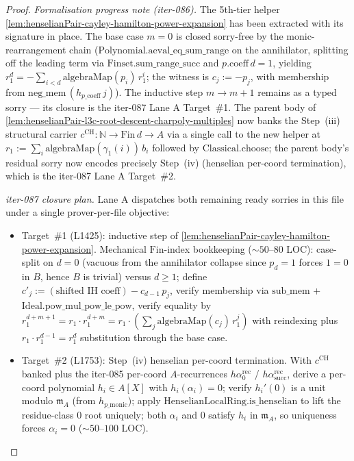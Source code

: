 \begin{proof}
\textit{Formalisation progress note (iter-086).} The 5th-tier
helper \cref{lem:henselianPair-cayley-hamilton-power-expansion}
has been extracted with its signature in place. The base case
$m = 0$ is closed sorry-free by the monic-rearrangement chain
($\mathrm{Polynomial.aeval\_eq\_sum\_range}$ on the annihilator,
splitting off the leading term via
$\mathrm{Finset.sum\_range\_succ}$ and $p.\mathrm{coeff}\,d = 1$,
yielding $r_1^d = -\sum_{i < d} \mathrm{algebraMap}(p_i)\,r_1^i$;
the witness is $c_j := -p_j$, with membership from $\mathrm{neg
\_mem}\,(h_{p\_\mathrm{coeff}}\,j)$). The inductive step
$m \to m + 1$ remains as a typed sorry — its closure is the
iter-087 Lane A Target~\#1. The parent body of
\cref{lem:henselianPair-l3c-root-descent-charpoly-multiples}
now banks the Step~(iii) structural carrier $c^{\mathrm{CH}} :
\mathbb N \to \mathrm{Fin}\,d \to A$ via a single call to the
new helper at $r_1 := \sum_i \mathrm{algebraMap}(\gamma_1(i))\,b_i$
followed by $\mathrm{Classical.choose}$; the parent body's
residual sorry now encodes precisely Step~(iv) (henselian
per-coord termination), which is the iter-087 Lane A Target~\#2.

\textit{iter-087 closure plan.} Lane A dispatches both
remaining ready sorries in this file under a single
prover-per-file objective:
\begin{itemize}
\item Target~\#1 (L1425): inductive step of
\cref{lem:henselianPair-cayley-hamilton-power-expansion}.
Mechanical $\mathrm{Fin}$-index bookkeeping ($\sim 50$--$80$
LOC): case-split on $d = 0$ (vacuous from the annihilator
collapse since $p_d = 1$ forces $1 = 0$ in $B$, hence $B$ is
trivial) versus $d \ge 1$; define
$c'_j := (\text{shifted IH coeff}) - c_{d-1}\,p_j$, verify
membership via $\mathrm{sub\_mem}$ +
$\mathrm{Ideal.pow\_mul\_pow\_le\_pow}$, verify equality by
$r_1^{d + m + 1} = r_1 \cdot r_1^{d + m} = r_1 \cdot
(\sum_j \mathrm{algebraMap}(c_j)\,r_1^{j})$ with reindexing
plus $r_1 \cdot r_1^{d - 1} = r_1^d$ substitution through the
base case.
\item Target~\#2 (L1753): Step~(iv) henselian per-coord
termination. With $c^{\mathrm{CH}}$ banked plus the iter-085
per-coord $A$-recurrences $h\alpha_0^{\mathrm{rec}}$ /
$h\alpha_{\mathrm{succ}}^{\mathrm{rec}}$, derive a per-coord
polynomial $h_i \in A[X]$ with $h_i(\alpha_i) = 0$; verify
$h_i'(0)$ is a unit modulo $\mathfrak m_A$ (from $h_{p\_
\mathrm{monic}}$); apply $\mathrm{HenselianLocalRing.is\_henselian}$
to lift the residue-class $0$ root uniquely; both $\alpha_i$
and $0$ satisfy $h_i$ in $\mathfrak m_A$, so uniqueness forces
$\alpha_i = 0$ ($\sim 50$--$100$ LOC).
\end{itemize}


\end{proof}
